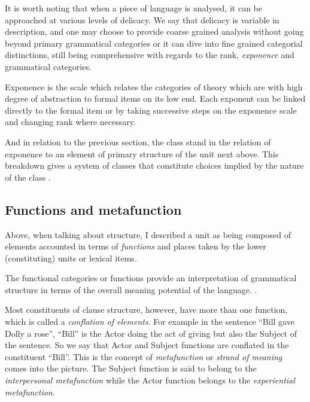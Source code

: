 
It is worth noting that when a piece of language is analysed, it can be approached at various levels of delicacy. We say that delicacy is variable in description, and one may choose to provide coarse grained analysis without going beyond primary grammatical categories or it can dive into fine grained categorial distinctions, still being comprehensive with regards to the rank, \textit{exponence} and grammatical categories. 

\begin{definition}[Exponence]\label{def:exponence-sydney}
    Exponence is the scale which relates the categories of theory which are with high degree of abstraction to formal items on its low end. Each exponent can be linked directly to the formal item or by taking successive steps on the exponence scale and changing rank where necessary. \citet[57]{Halliday2002}
\end{definition}

And in relation to the previous section, the class stand in the relation of exponence to an element of primary structure of the unit next above. This breakdown gives a system of classes that constitute choices implied by the nature of the class \citep[41]{Halliday2002}. 



\subsection{Functions and metafunction}
\label{sec:functions-metafunctions}
Above, when talking about structure, I described a unit as being composed of elements accounted in terms of \textit{functions} and places taken by the lower (constituting) units or lexical items.

\begin{definition}[Function]\label{def:function}
	The functional categories or functions provide an interpretation of grammatical structure in terms of the overall meaning potential of the language. \citep[76]{Halliday2013}.
\end{definition}

Most constituents of clause structure, however, have more than one function, which is called a \textit{conflation of elements}. For example in the sentence ``Bill gave Dolly a rose'', ``Bill'' is the Actor doing the act of giving but also the Subject of the sentence. So we say that Actor and Subject functions are conflated in the constituent ``Bill''. This is the concept of \textit{metafunction} or \textit{strand of meaning} comes into the picture. The Subject function is said to belong to the \textit{interpersonal metafunction} while the Actor function belongs to the \textit{experiential metafunction}. 

